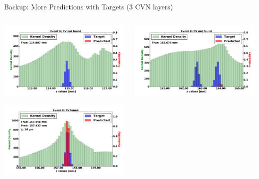 \begin{frame}{Backup: More Predictions with Targets (3 CVN layers)}
  \begin{columns}[c]
        \begin{center}
            \includegraphics[width=1\textwidth,height=0.45\textwidth, trim=18 0 18 0]{images/120000_3layer_49.pdf}
    
            \includegraphics[width=1\textwidth, height=0.45\textwidth,trim=18 0 18 0]{images/120000_3layer_50.pdf}

        \end{center}
        \begin{center}
           \includegraphics[width=1\textwidth, height=0.45\textwidth, trim=18 0 18 0]{images/120000_3layer_51.pdf}
    

\end{center}
\end{columns}
\end{frame}
